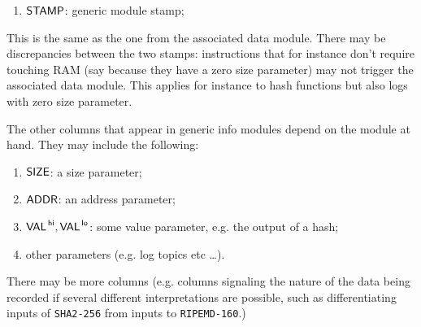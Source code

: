 \begin{enumerate}
\item $\textsf{STAMP}$: generic module stamp;
\end{enumerate}
This is the same as the one from the associated data module. There may be discrepancies between the two stamps: instructions that for instance don't require touching RAM (say because they have a zero size parameter) may not trigger the associated data module. This applies for instance to hash functions but also logs with zero size parameter. 

The other columns that appear in generic info modules depend on the module at hand. They may include the following: 
\begin{enumerate}[resume]
\item $\textsf{SIZE}$: a size parameter;
\item $\textsf{ADDR}$: an address parameter;
\item $\textsf{VAL}^{\mathsf{\,hi}}, \textsf{VAL}^{\mathsf{\,lo}}$: some value parameter, e.g. the output of a hash;
\item other parameters (e.g. log topics etc \dots).
\end{enumerate}
There may be more columns (e.g. columns signaling the nature of the data being recorded if several different interpretations are possible, such as differentiating inputs of \texttt{SHA2-256} from inputs to \texttt{RIPEMD-160}.)
